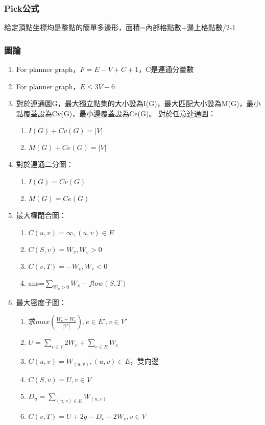 \subsubsection{Pick公式}
給定頂點坐標均是整點的簡單多邊形，面積=內部格點數+邊上格點數/2-1

\subsubsection{圖論}

\begin{enumerate}\itemsep = -5pt
\item For planner graph，$F=E-V+C+1$，C是連通分量數
\item For planner graph，$E\leq 3V-6$
\item 對於連通圖G，最大獨立點集的大小設為I(G)，最大匹配大小設為M(G)，最小點覆蓋設為Cv(G)，最小邊覆蓋設為Ce(G)。
對於任意連通圖：
	\begin{enumerate}\itemsep = -3pt
	\item $I(G)+Cv(G)=|V|$
	\item $M(G)+Ce(G)=|V|$
	\end{enumerate}
\item 對於連通二分圖：
	\begin{enumerate}\itemsep = -3pt
	\item $I(G)=Cv(G)$
	\item $M(G)=Ce(G)$
	\end{enumerate}
\item 最大權閉合圖：
	\begin{enumerate}\itemsep = -3pt
	\item $C(u,v)=\infty ,(u,v)\in E$
	\item $C(S,v)=W_v ,W_v>0$
	\item $C(v,T)=-W_v ,W_v<0$
	\item ans=$\sum_{W_v>0} W_v-flow(S,T)$
	\end{enumerate}
\item 最大密度子圖：
	\begin{enumerate}\itemsep = -1pt
	\item 求$max\left(\frac{W_e+W_v}{|V'|}\right),e \in E',v \in V'$
	\item $U=\sum_{v \in V}2W_v+\sum_{e \in E} W_e$
	\item $C(u,v)=W_{(u,v)} ,(u,v)\in E$，雙向邊
	\item $C(S,v)=U ,v \in V$
	\item $D_u=\sum_{(u,v) \in E} W_{(u,v)}$
	\item $C(v,T)=U+2g-D_v-2W_v ,v \in V$

\end{enumerate}
\end{enumerate}
